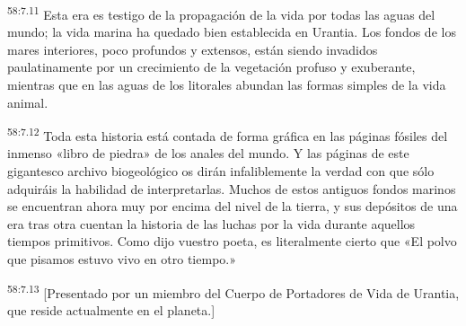 \par
\textsuperscript{58:7.11} Esta era es testigo de la propagación de la vida por todas las aguas del mundo; la vida marina ha quedado bien establecida en Urantia. Los fondos de los mares interiores, poco profundos y extensos, están siendo invadidos paulatinamente por un crecimiento de la vegetación profuso y exuberante, mientras que en las aguas de los litorales abundan las formas simples de la vida animal.

\par
\textsuperscript{58:7.12} Toda esta historia está contada de forma gráfica en las páginas fósiles del inmenso «libro de piedra» de los anales del mundo. Y las páginas de este gigantesco archivo biogeológico os dirán infaliblemente la verdad con que sólo adquiráis la habilidad de interpretarlas. Muchos de estos antiguos fondos marinos se encuentran ahora muy por encima del nivel de la tierra, y sus depósitos de una era tras otra cuentan la historia de las luchas por la vida durante aquellos tiempos primitivos. Como dijo vuestro poeta, es literalmente cierto que «El polvo que pisamos estuvo vivo en otro tiempo.»

\par
\textsuperscript{58:7.13} [Presentado por un miembro del Cuerpo de Portadores de Vida de Urantia, que reside actualmente en el planeta.]